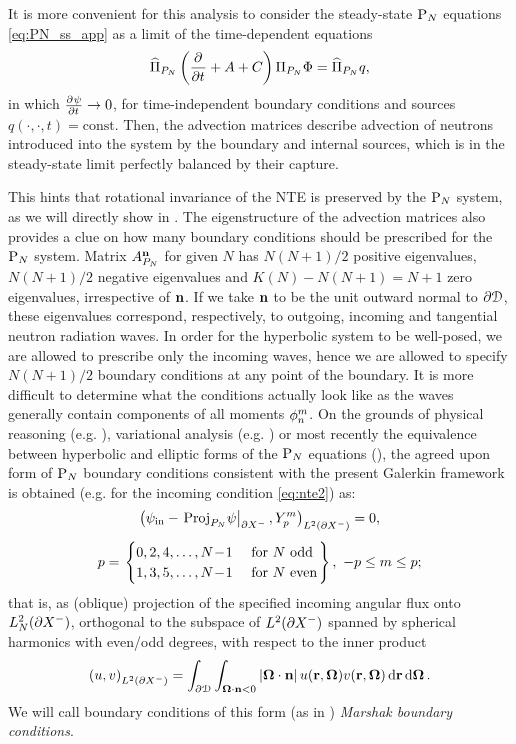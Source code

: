 It is more convenient for this analysis to consider the steady-state $\PN$ equations \eqref{eq:PN_ss_app} as a limit of the 
time-dependent equations
\begin{equation}\label{eq:PN_ss_app}
	\PihPN \left(\pd{}{t} + A + C\right) \PiPN\Phi = \PihPN q,
\end{equation}
in which $\pd{\psi}{t} \to 0$, for time-independent boundary conditions and sources
\linebreak[4]\mbox{$q(\cdot,\cdot,t) = \text{const}$}.
Then, the advection matrices describe advection of neutrons introduced into the system by the boundary and internal
sources, which is in the steady-state limit perfectly balanced by their capture.

This hints that rotational invariance of the NTE is preserved by the $\PN$ system, as we will directly show in 
. The eigenstructure of the advection matrices also provides a clue on how many boundary conditions
should be prescribed for the $\PN$ system. Matrix $A_{P_N}^{\bn}$ for given $N$ has
$N(N+1)/2$ positive eigenvalues, $N(N+1)/2$ negative eigenvalues and $K(N) - N(N+1) = N+1$ zero eigenvalues,
irrespective of $\bn$. If we take $\bn$ to be the unit outward normal to $\pV$, these eigenvalues correspond,
respectively, to outgoing, incoming and tangential neutron radiation waves. In order for the hyperbolic system to be
well-posed, we are allowed to prescribe only the incoming waves, hence we are allowed to specify $N(N+1)/2$ boundary
conditions at any point of the boundary. It is more difficult to determine what the conditions actually look like as the
waves generally contain components of all moments $\angmom{n}{m}$. On the grounds of physical reasoning
(e.g. \cite{Rumyantsev}), variational analysis (e.g. \cite{Davis}) or most recently the equivalence between hyperbolic
and elliptic forms of the $\PN$ equations (\cite{Sanchez8}), the agreed upon form of $\PN$ boundary conditions
consistent with the present Galerkin framework is obtained (e.g. for the incoming condition \eqref{eq:nte2}) as:
$$
\begin{gathered}
	\left(\psi_\text{in} - \left.\Projop[P_N]\!\psi\right\vert_{\pX[-]}, \Y{p}{m} \right)_{\Lp[2](\pX[-])} = 0,\\[.35em] 
	p = 
	\left.\begin{cases}
		0,2,4,\ldots,N\!-\!1 & \mbox{ for $N$ odd}\\
		1,3,5,\ldots,N\!-\!1 & \mbox{ for $N$ even}	
	\end{cases}\right\},\ -p \leq m \leq p;
\end{gathered}
$$
that is, as (oblique) projection of the specified incoming angular flux onto $\Lp[2]_N(\pX[-])$, orthogonal
to the subspace of $\Lp[2](\pX[-])$ spanned by spherical harmonics with even/odd degrees, with respect to the inner product
$$
	\left(u,v\right)_{\Lp[2](\pX[-])} = \int_{\pV}\int_{\bomega\cdot\bn < 0}\abs{\bomega\cdot\bn}
	u(\br,\bomega)v(\br,\bomega)\,\d{\br}\d{\bomega}.
$$
We will call boundary conditions of this form (as in \cite{Davis}) \textit{Marshak boundary conditions}.

